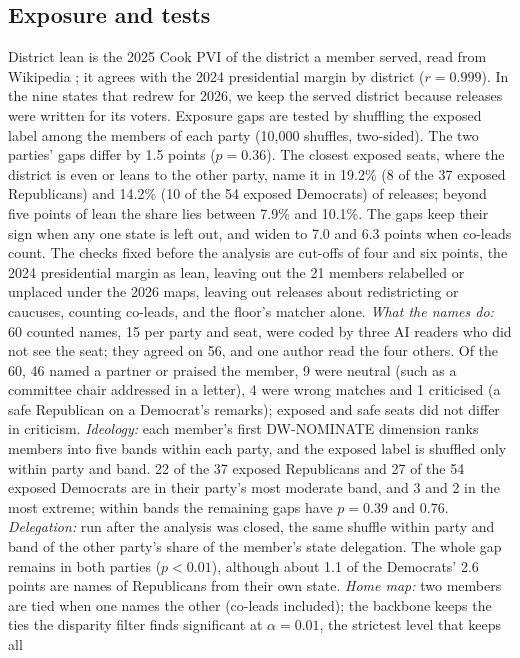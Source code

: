 \documentclass[9pt,twocolumn,twoside]{pnas-new}
\begin{document}
{\subsection*{Exposure and tests}
District lean is the 2025 Cook PVI \cite{cook2025pvi} of the district a member served, read from Wikipedia
\cite{wikipedia2025pvi}; it agrees with the 2024 presidential margin by district \cite{downballot2024} ($r = 0.999$).
In the nine states that redrew for 2026, we keep the served district because releases were written for its voters.
Exposure gaps are tested by shuffling the exposed label among the members of each party (10,000 shuffles,
two-sided). The two parties' gaps differ by 1.5 points ($p = 0.36$). The closest exposed seats, where the district is even or leans to the other party, name it in 19.2\% (8 of the 37
exposed Republicans) and 14.2\% (10 of the 54 exposed Democrats) of releases; beyond five points of lean the
share lies between 7.9\% and 10.1\%. The gaps keep their sign when any one state is left out, and widen to 7.0 and
6.3 points when co-leads count. The checks fixed before the analysis are cut-offs of four and six points, the 2024 presidential margin as
lean, leaving out the 21 members relabelled or unplaced under the 2026 maps, leaving out releases about redistricting
or caucuses, counting co-leads, and the floor's matcher alone. \emph{What the names do:} 60 counted names, 15 per party
and seat, were coded by three AI readers who did not see the seat; they agreed on 56, and one author read the
four others. Of the 60, 46 named a partner or praised the member, 9 were neutral (such as a committee chair addressed in a
letter), 4 were wrong matches and 1 criticised (a safe Republican on a Democrat's remarks); exposed and safe seats did
not differ in criticism. \emph{Ideology:} each member's first DW-NOMINATE dimension \cite{voteview2026} ranks members into five
bands within each party, and the exposed label is shuffled only within party and band. 22 of the 37 exposed Republicans and 27 of the 54 exposed Democrats are in their party's most moderate band, and 3
and 2 in the most extreme; within bands the remaining gaps have $p = 0.39$ and $0.76$. \emph{Delegation:} run after
the analysis was closed, the same shuffle within party and band of the other party's share of the member's state
delegation. The whole gap remains in both parties ($p < 0.01$), although about 1.1 of the Democrats' 2.6 points are names of
Republicans from their own state. \emph{Home map:} two members are tied when one names the other (co-leads included); the backbone keeps the
ties the disparity filter \cite{serrano2009} finds significant at $\alpha = 0.01$, the strictest level that keeps all
}
\end{document}
